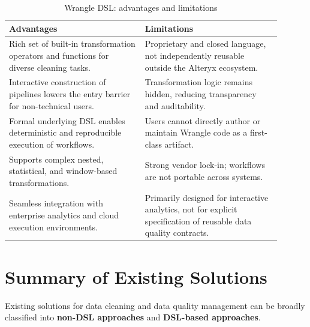 \begin{table}[h]
\centering
\caption{Wrangle DSL: advantages and limitations}
\begin{tabular}{|p{0.45\linewidth}| p{0.45\linewidth}|}
\hline
\textbf{Advantages} & \textbf{Limitations} \\
\hline
Rich set of built-in transformation operators and functions for diverse cleaning tasks. &
Proprietary and closed language, not independently reusable outside the Alteryx ecosystem. \\
\hline
Interactive construction of pipelines lowers the entry barrier for non-technical users. &
Transformation logic remains hidden, reducing transparency and auditability. \\
\hline
Formal underlying DSL enables deterministic and reproducible execution of workflows. &
Users cannot directly author or maintain Wrangle code as a first-class artifact. \\
\hline
Supports complex nested, statistical, and window-based transformations. &
Strong vendor lock-in; workflows are not portable across systems. \\
\hline
Seamless integration with enterprise analytics and cloud execution environments. &
Primarily designed for interactive analytics, not for explicit specification of reusable data quality contracts. \\
\hline
\end{tabular}
\end{table}

\section{Summary of Existing Solutions}

Existing solutions for data cleaning and data quality management can be broadly classified into \textbf{non-DSL approaches} and \textbf{DSL-based approaches}. 

